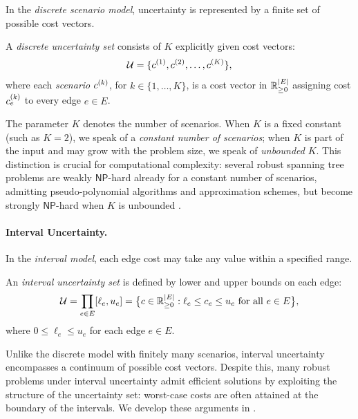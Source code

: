 In the \emph{\textcolor{RWTHBlue}{discrete scenario model}}, uncertainty is represented by a finite set of possible cost vectors.

\begin{definition}\label{def:discrete-uncertainty}
A \emph{\textcolor{RWTHBlue}{discrete uncertainty set}} consists of $K$ explicitly given cost vectors:
\[
\mathcal{U} = \{c^{(1)}, c^{(2)}, \ldots, c^{(K)}\},
\]
where each \emph{\textcolor{RWTHBlue}{scenario}} $c^{(k)}$, for $k \in \{1, \ldots, K\}$, is a cost vector in $\mathbb{R}^{|E|}_{\geq 0}$ assigning cost $c^{(k)}_e$ to every edge $e \in E$.
\end{definition}

The parameter $K$ denotes the number of scenarios.
When $K$ is a fixed constant (such as $K = 2$), we speak of a \emph{constant number of scenarios}; when $K$ is part of the input and may grow with the problem size, we speak of \emph{unbounded} $K$.
This distinction is crucial for computational complexity: several robust spanning tree problems are weakly $\mathsf{NP}$-hard already for a constant number of scenarios, admitting pseudo-polynomial algorithms and approximation schemes, but become strongly $\mathsf{NP}$-hard when $K$ is unbounded \cite{AissiBazganVanderpooten2009Survey}.

\paragraph{Interval Uncertainty.}

In the \emph{\textcolor{RWTHBlue}{interval model}}, each edge cost may take any value within a specified range.

\begin{definition}\label{def:interval-uncertainty}
An \emph{\textcolor{RWTHBlue}{interval uncertainty set}} is defined by lower and upper bounds on each edge:
\[
\mathcal{U} = \prod_{e \in E} [\ell_e, u_e] = \bigl\{c \in \mathbb{R}^{|E|}_{\geq 0} : \ell_e \leq c_e \leq u_e \text{ for all } e \in E\bigr\},
\]
where $0 \leq \ell_e \leq u_e$ for each edge $e \in E$.
\end{definition}

Unlike the discrete model with finitely many scenarios, interval uncertainty encompasses a continuum of possible cost vectors.
Despite this, many robust problems under interval uncertainty admit efficient solutions by exploiting the structure of the uncertainty set: worst-case costs are often attained at the boundary of the intervals.
We develop these arguments in .

